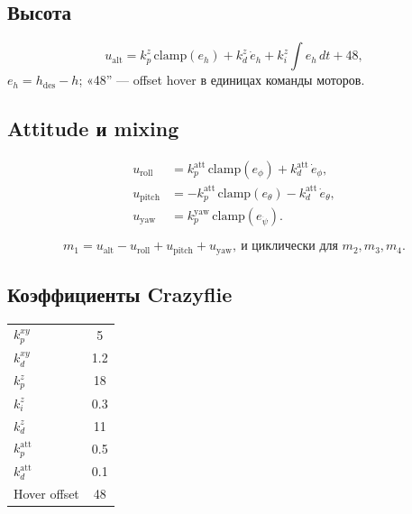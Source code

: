 \documentclass[a4paper,11pt]{article}
\begin{document}
\subsection{Высота}

\begin{equation}
  u_{\mathrm{alt}} = k_p^z\,\mathrm{clamp}(e_h)
  + k_d^z\,\dot e_h + k_i^z \!\int\! e_h\,dt + 48,
  \label{eq:cf_alt}
\end{equation}
$e_h = h_{\mathrm{des}} - h$; «48'' --- offset hover в единицах команды моторов.

\subsection{Attitude и mixing}

\begin{align}
  u_{\mathrm{roll}} &= k_p^{\mathrm{att}}\,\mathrm{clamp}(e_\phi)
  + k_d^{\mathrm{att}}\,\dot e_\phi, \nonumber\\
  u_{\mathrm{pitch}} &= -k_p^{\mathrm{att}}\,\mathrm{clamp}(e_\theta)
  - k_d^{\mathrm{att}}\,\dot e_\theta, \nonumber\\
  u_{\mathrm{yaw}} &= k_p^{\mathrm{yaw}}\,\mathrm{clamp}(e_{\dot\psi}).
\end{align}

\begin{equation}
  m_1 = u_{\mathrm{alt}} - u_{\mathrm{roll}} + u_{\mathrm{pitch}} + u_{\mathrm{yaw}},\ \text{и циклически для } m_2,m_3,m_4.
  \label{eq:cf_mix}
\end{equation}

\subsection{Коэффициенты Crazyflie}

\begin{center}
\renewcommand{\arraystretch}{1.2}
\begin{tabular}{|l|c|}
\hline
$k_p^{xy}$ & 5 \\
$k_d^{xy}$ & 1.2 \\
$k_p^z$ & 18 \\
$k_i^z$ & 0.3 \\
$k_d^z$ & 11 \\
$k_p^{\mathrm{att}}$ & 0.5 \\
$k_d^{\mathrm{att}}$ & 0.1 \\
Hover offset & 48 \\
\hline
\end{tabular}
\end{center}
\end{document}
